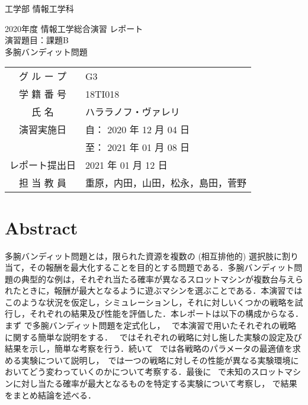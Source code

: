 \documentclass{jsarticle}
\begin{document}
\begin{titlepage}
	\begin{flushleft}
	{\Large 工学部 情報工学科}
	\end{flushleft}
	\vspace{100pt}
	\begin{center}
		{\huge 2020年度 情報工学総合演習 レポート}\\
		\vspace{40pt}
		{\huge 演習題目：課題B}\\ \vspace{10pt}
		{\huge 多腕バンディット問題}\\
		\vspace{100pt}
		\begin{table}[hp]
			\centering \LARGE
			\begin{tabular}{cl}
				グ ル ー プ    & G3 \\
				学 籍 番 号    & 18TI018 \\
				氏 名          & ハララノフ・ヴァレリ \\
				演習実施日     & 自： 2020 年 12 月 04 日\\
				               & 至： 2021 年 01 月 08 日 \\
				レポート提出日 & 2021 年 01 月 12 日 \\
				担 当 教 員 & 重原，内田，山田，松永，島田，菅野 \\
			\end{tabular}
		\end{table}
		\vfill
	\end{center}
\end{titlepage}
\newpage

\section*{Abstract}

多腕バンディット問題とは，限られた資源を複数の (相互排他的) 選択肢に割り当て，その報酬を最大化することを目的とする問題である．多腕バンディット問題の典型的な例は，それぞれ当たる確率が異なるスロットマシンが複数台与えられたときに，報酬が最大となるように遊ぶマシンを選ぶことである．本演習ではこのような状況を仮定し，シミュレーションし，それに対しいくつかの戦略を試行し，それぞれの結果及び性能を評価した．本レポートは以下の構成からなる．まず  で多腕バンディット問題を定式化し， ~で本演習で用いたそれぞれの戦略に関する簡単な説明をする． ~ではそれぞれの戦略に対し施した実験の設定及び結果を示し，簡単な考察を行う．続いて ~では各戦略のパラメータの最適値を求める実験について説明し，~では一つの戦略に対しその性能が異なる実験環境においてどう変わっていくのかについて考察する．最後に ~で未知のスロットマシンに対し当たる確率が最大となるものを特定する実験について考察し， で結果をまとめ結論を述べる．
\end{document}
